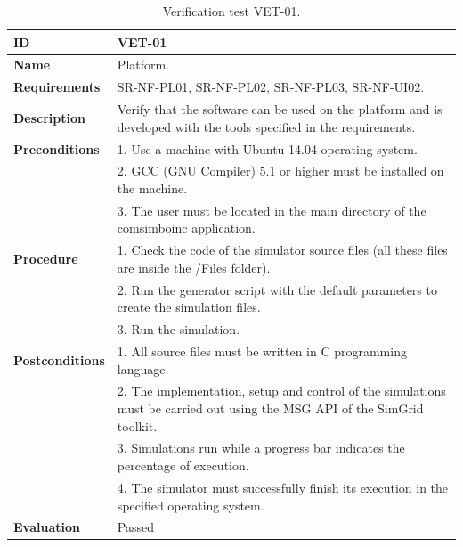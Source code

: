 \begin{center}
\begin{table}[htb]
\centering
\begin{tabular}{@{}p{2.5cm} p{13cm}@{}} 
\toprule
\textbf{ID} 					& VET-01 \\
\midrule
\textbf{Name} 				& Platform. \\
\midrule
\textbf{Requirements} 		& SR-NF-PL01, SR-NF-PL02, SR-NF-PL03, SR-NF-UI02. \\
\midrule
\textbf{Description} 		& Verify that the software can be used on the platform and is developed with the tools specified in the requirements. \\
\midrule
\textbf{Preconditions}		& 1. Use a machine with Ubuntu 14.04 operating system.\\
							& 2. GCC (GNU Compiler) 5.1 or higher must be installed on the machine. \\
							& 3. The user must be located in the main directory of the \gls{comsimboinc} application. \\
\midrule
\textbf{Procedure}			& 1. Check the code of the simulator source files (all these files are inside the /Files folder). \\
							& 2. Run the generator script with the default parameters to create the simulation files.\\
							& 3. Run the simulation.\\
\midrule
\textbf{Postconditions} 		& 1. All source files must be written in C programming language.\\
							& 2. The implementation, setup and control of the simulations must be carried out using the MSG API of the SimGrid toolkit.\\
							& 3. Simulations run while a progress bar indicates the percentage of execution. \\			
							& 4. The simulator must successfully finish its execution in the specified operating system. \\
\midrule
\textbf{Evaluation} 			& Passed \\
\bottomrule
\end{tabular}
\caption{Verification test VET-01.}
\label{tab:vet01}
\end{table}
\end{center}


